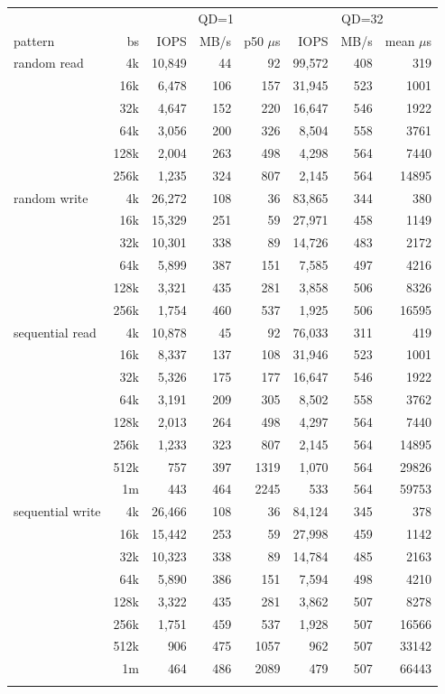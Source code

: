\begin{tabular}{lrrrrrrr}
\toprule
 & & \multicolumn{3}{c}{QD=1} & \multicolumn{3}{c}{QD=32} \\
pattern & bs & IOPS & MB/s & p50 $\mu$s & IOPS & MB/s & mean $\mu$s \\
\midrule
random read & 4k & 10,849 & 44 & 92 & 99,572 & 408 & 319 \\
 & 16k & 6,478 & 106 & 157 & 31,945 & 523 & 1001 \\
 & 32k & 4,647 & 152 & 220 & 16,647 & 546 & 1922 \\
 & 64k & 3,056 & 200 & 326 & 8,504 & 558 & 3761 \\
 & 128k & 2,004 & 263 & 498 & 4,298 & 564 & 7440 \\
 & 256k & 1,235 & 324 & 807 & 2,145 & 564 & 14895 \\
\addlinespace
random write & 4k & 26,272 & 108 & 36 & 83,865 & 344 & 380 \\
 & 16k & 15,329 & 251 & 59 & 27,971 & 458 & 1149 \\
 & 32k & 10,301 & 338 & 89 & 14,726 & 483 & 2172 \\
 & 64k & 5,899 & 387 & 151 & 7,585 & 497 & 4216 \\
 & 128k & 3,321 & 435 & 281 & 3,858 & 506 & 8326 \\
 & 256k & 1,754 & 460 & 537 & 1,925 & 506 & 16595 \\
\addlinespace
sequential read & 4k & 10,878 & 45 & 92 & 76,033 & 311 & 419 \\
 & 16k & 8,337 & 137 & 108 & 31,946 & 523 & 1001 \\
 & 32k & 5,326 & 175 & 177 & 16,647 & 546 & 1922 \\
 & 64k & 3,191 & 209 & 305 & 8,502 & 558 & 3762 \\
 & 128k & 2,013 & 264 & 498 & 4,297 & 564 & 7440 \\
 & 256k & 1,233 & 323 & 807 & 2,145 & 564 & 14895 \\
 & 512k & 757 & 397 & 1319 & 1,070 & 564 & 29826 \\
 & 1m & 443 & 464 & 2245 & 533 & 564 & 59753 \\
\addlinespace
sequential write & 4k & 26,466 & 108 & 36 & 84,124 & 345 & 378 \\
 & 16k & 15,442 & 253 & 59 & 27,998 & 459 & 1142 \\
 & 32k & 10,323 & 338 & 89 & 14,784 & 485 & 2163 \\
 & 64k & 5,890 & 386 & 151 & 7,594 & 498 & 4210 \\
 & 128k & 3,322 & 435 & 281 & 3,862 & 507 & 8278 \\
 & 256k & 1,751 & 459 & 537 & 1,928 & 507 & 16566 \\
 & 512k & 906 & 475 & 1057 & 962 & 507 & 33142 \\
 & 1m & 464 & 486 & 2089 & 479 & 507 & 66443 \\
\addlinespace
\bottomrule
\end{tabular}
